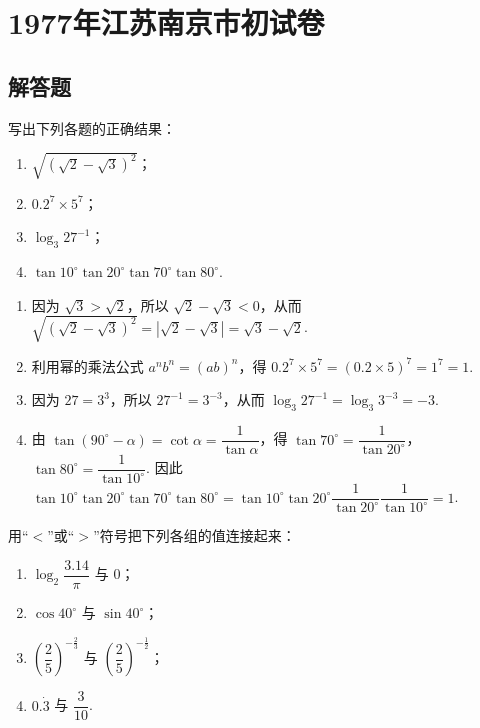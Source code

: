 \chapter{1977年江苏南京市初试卷}

\section{解答题}

\begin{problem}
写出下列各题的正确结果：

\begin{enumerate}
    \item \(\sqrt{\left(\sqrt{2}-\sqrt{3}\right)^2}\)；
    \item \(0.2^7\times5^7\)；
    \item \(\log_3 27^{-1}\)；
    \item \(\tan 10^\circ\tan 20^\circ\tan 70^\circ\tan 80^\circ\).
\end{enumerate}
\end{problem}

\begin{solution}
\begin{enumerate}
    \item 因为 \(\sqrt{3}>\sqrt{2}\)，所以 \(\sqrt{2}-\sqrt{3}<0\)，从而 \(\sqrt{\left(\sqrt{2}-\sqrt{3}\right)^2}=\left|\sqrt{2}-\sqrt{3}\right|=\sqrt{3}-\sqrt{2}\).
    \item 利用幂的乘法公式 \(a^n b^n=(ab)^n\)，得 \(0.2^7\times5^7=(0.2\times5)^7=1^7=1\).
    \item 因为 \(27=3^3\)，所以 \(27^{-1}=3^{-3}\)，从而 \(\log_3 27^{-1}=\log_3 3^{-3}=-3\).
    \item 由 \(\tan(90^\circ-\alpha)=\cot\alpha=\dfrac{1}{\tan\alpha}\)，得 \(\tan70^\circ=\dfrac{1}{\tan20^\circ}\)，\(\tan80^\circ=\dfrac{1}{\tan10^\circ}\). 因此 \(\tan10^\circ\tan20^\circ\tan70^\circ\tan80^\circ=\tan10^\circ\tan20^\circ\dfrac{1}{\tan20^\circ}\dfrac{1}{\tan10^\circ}=1\).
\end{enumerate}
\end{solution}

\begin{problem}
用“\(<\)”或“\(>\)”符号把下列各组的值连接起来：

\begin{enumerate}
    \item \(\log_2\dfrac{3.14}{\pi}\) 与 \(0\)；
    \item \(\cos40^\circ\) 与 \(\sin40^\circ\)；
    \item \(\left(\dfrac{2}{5}\right)^{-\frac{2}{3}}\) 与 \(\left(\dfrac{2}{5}\right)^{-\frac{1}{2}}\)；
    \item \(0.\dot{3}\) 与 \(\dfrac{3}{10}\).
\end{enumerate}
\end{problem}

